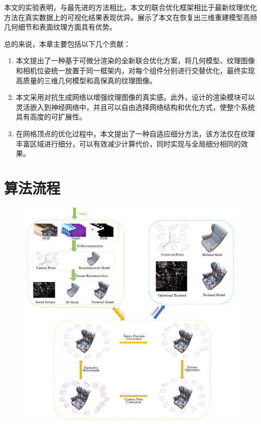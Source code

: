 本文的实验表明，与最先进的方法相比，本文的联合优化框架相比于最新纹理优化方法在真实数据上的可视化结果表现优异。展示了本文在恢复出三维重建模型高频几何细节和表面纹理方面具有优势。\par
总的来说，本章主要包括以下几个贡献：\par
\begin{enumerate}[label=(\arabic*),leftmargin=\parindent,align=left,labelwidth=\parindent,labelsep=0pt]
\item 本文提出了一种基于可微分渲染的全新联合优化方案，将几何模型、纹理图像和相机位姿统一放置于同一框架内，对每个组件分别进行交替优化，最终实现高质量的三维几何模型和高保真的纹理图像。
\item 本文采用对抗生成网络以增强纹理图像的真实感。此外，设计的渲染模块可以灵活嵌入到神经网络中，并且可以自由选择网络结构和优化方式，使整个系统具有高度的可扩展性。
\item 在网格顶点的优化过程中，本文提出了一种自适应细分方法，该方法仅在纹理丰富区域进行细分，可以有效减少计算代价，同时实现与全局细分相同的效果。
\end{enumerate}

\section{算法流程}
\begin{figure}[!t]
    \centering
    \includegraphics[width=1\columnwidth]{pic/work2/work2.pdf}
    \label{fig:work2}
\end{figure}

